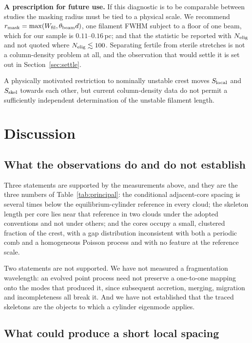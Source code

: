 \documentclass[usenatbib,twoside,twocolumn]{mnras}
\begin{document}
\smallskip\noindent\textbf{A prescription for future use.} If this diagnostic is to be comparable between studies the masking radius must be tied to a physical scale. We recommend $r_{\rm mask}=\max(W_{\rm fil},\theta_{\rm beam}d)$, one filament FWHM subject to a floor of one beam, which for our sample is $0.11$--$0.16$\,pc; and that the statistic be reported with $N_{\rm elig}$ and not quoted where $N_{\rm elig}\lesssim100$. Separating fertile from sterile stretches is not a column-density problem at all, and the observation that would settle it is set out in Section~\ref{sec:settle}.

A physically motivated restriction to nominally unstable crest moves $S_{\rm local}$ and $S_{\rm skel}$ towards each other, but current column-density data do not permit a sufficiently independent determination of the unstable filament length.




\section{Discussion}
\label{sec:discussion}

\subsection{What the observations do and do not establish}

Three statements are supported by the measurements above, and they are the three numbers of Table~\ref{tab:principal}: the conditional adjacent-core spacing is several times below the equilibrium-cylinder reference in every cloud; the skeleton length per core lies near that reference in two clouds under the adopted conventions and not under others; and the cores occupy a small, clustered fraction of the crest, with a gap distribution inconsistent with both a periodic comb and a homogeneous Poisson process and with no feature at the reference scale.

Two statements are not supported. We have not measured a fragmentation wavelength: an evolved point process need not preserve a one-to-one mapping onto the modes that produced it, since subsequent accretion, merging, migration and incompleteness all break it. And we have not established that the traced skeletons are the objects to which a cylinder eigenmode applies.

\subsection{What could produce a short local spacing}
\end{document}
